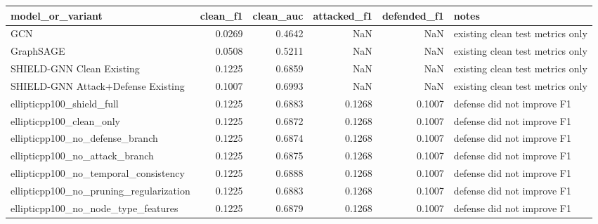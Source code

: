 \begin{tabular}{lrrrrl}
\toprule
model_or_variant & clean_f1 & clean_auc & attacked_f1 & defended_f1 & notes \\
\midrule
GCN & 0.0269 & 0.4642 & NaN & NaN & existing clean test metrics only \\
GraphSAGE & 0.0508 & 0.5211 & NaN & NaN & existing clean test metrics only \\
SHIELD-GNN Clean Existing & 0.1225 & 0.6859 & NaN & NaN & existing clean test metrics only \\
SHIELD-GNN Attack+Defense Existing & 0.1007 & 0.6993 & NaN & NaN & existing clean test metrics only \\
ellipticpp100_shield_full & 0.1225 & 0.6883 & 0.1268 & 0.1007 & defense did not improve F1 \\
ellipticpp100_clean_only & 0.1225 & 0.6872 & 0.1268 & 0.1007 & defense did not improve F1 \\
ellipticpp100_no_defense_branch & 0.1225 & 0.6874 & 0.1268 & 0.1007 & defense did not improve F1 \\
ellipticpp100_no_attack_branch & 0.1225 & 0.6875 & 0.1268 & 0.1007 & defense did not improve F1 \\
ellipticpp100_no_temporal_consistency & 0.1225 & 0.6888 & 0.1268 & 0.1007 & defense did not improve F1 \\
ellipticpp100_no_pruning_regularization & 0.1225 & 0.6883 & 0.1268 & 0.1007 & defense did not improve F1 \\
ellipticpp100_no_node_type_features & 0.1225 & 0.6879 & 0.1268 & 0.1007 & defense did not improve F1 \\
\bottomrule
\end{tabular}
